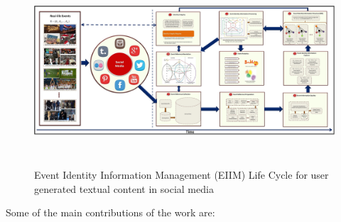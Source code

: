 \documentclass[12pt]{article}
\begin{document}
\begin{figure}[htbp]
\label{eiim}
  \caption{Event Identity Information Management (EIIM) Life Cycle for user generated textual content in social media}
  \centering
    \includegraphics[width=15.5cm,height=7cm]{EIIM.jpg}
\end{figure}

Some of the main contributions of the work are:
\end{document}
